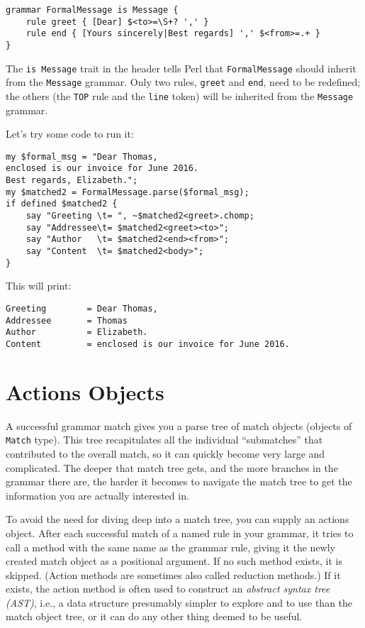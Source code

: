 \begin{verbatim}
grammar FormalMessage is Message {
    rule greet { [Dear] $<to>=\S+? ',' }
    rule end { [Yours sincerely|Best regards] ',' $<from>=.+ }
}
\end{verbatim}

The {\tt is Message} trait in the header tells Perl that 
{\tt FormalMessage} should inherit from the {\tt Message} grammar. 
Only two rules, {\tt greet} and {\tt end}, need to be 
redefined; the others (the {\tt TOP} rule 
and the {\tt line} token) will be inherited from the 
{\tt Message} grammar.

Let's try some code to run it:

\begin{verbatim}
my $formal_msg = "Dear Thomas,
enclosed is our invoice for June 2016.
Best regards, Elizabeth.";
my $matched2 = FormalMessage.parse($formal_msg);
if defined $matched2 { 
    say "Greeting \t= ", ~$matched2<greet>.chomp;
    say "Addressee\t= $matched2<greet><to>";
    say "Author   \t= $matched2<end><from>";
    say "Content  \t= $matched2<body>";
}
\end{verbatim}

This will print:

\begin{verbatim}
Greeting        = Dear Thomas,
Addressee       = Thomas
Author          = Elizabeth.
Content         = enclosed is our invoice for June 2016.
\end{verbatim}

\section{Actions Objects}

\label{actions_object}

A successful grammar match gives you a parse tree of 
match objects (objects of \verb'Match' type). This tree 
recapitulates all the individual 
``submatches'' that contributed to the overall match, so 
it can quickly become very large and complicated. 
The deeper that match tree gets, and the more branches in 
the grammar there are, the harder it becomes to navigate the 
match tree to get the information you are actually 
interested in.

To avoid the need for diving deep into a match tree, you 
can supply an actions object. After each successful match 
of a named rule in your grammar, it tries to call a method 
with the same name as the grammar rule, giving it the 
newly created match object as a positional argument. 
If no such method exists, it is skipped. (Action methods 
are sometimes also called reduction methods.) If it exists, 
the action method is often used to construct an \emph{abstract 
syntax tree (AST)}, i.e., a data structure presumably 
simpler to explore and to use than the match object tree, 
or it can do any other thing deemed to be useful.

